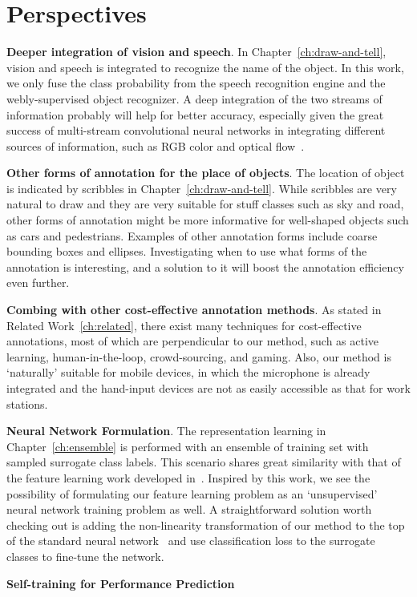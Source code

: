 \section{Perspectives} 

\textbf{Deeper integration of vision and speech}. In Chapter~\ref{ch:draw-and-tell}, vision and speech is integrated to recognize the name of the object. In this work, we only fuse the class probability from the speech recognition engine and the webly-supervised object recognizer. A deep integration of the two streams of information probably will help for better accuracy, especially given the great success of multi-stream convolutional neural networks in integrating different sources of information, such as RGB color and optical flow~\citep{two:stream:cnn}.  


\textbf{Other forms of annotation for the place of objects}. The location of object is indicated by scribbles in Chapter~\ref{ch:draw-and-tell}. While scribbles are very natural to draw and  they are very suitable for stuff classes such as sky and road, other forms of annotation might be more informative for well-shaped objects such as cars and pedestrians. Examples of other annotation forms include coarse bounding boxes and ellipses. Investigating when to use what forms of the annotation is interesting, and a solution to it will boost the annotation efficiency even further.  


\textbf{Combing with other cost-effective annotation methods}. As stated in Related Work~\ref{ch:related}, there exist many techniques for cost-effective annotations, most of which are perpendicular to our method, such as active learning, human-in-the-loop, crowd-sourcing, and gaming.  Also, our method is `naturally'  suitable for mobile devices, in which the microphone is already integrated and the hand-input devices are not as easily accessible as that for work stations. 
 

\textbf{Neural Network Formulation}. The  representation learning in Chapter~\ref{ch:ensemble} is performed with an ensemble of training set with sampled surrogate class labels. This scenario shares great similarity with that of the feature learning work developed in~\citep{cnnfet14}. Inspired by this work, we see the possibility of formulating our feature learning  problem as an `unsupervised' neural network training problem as well. A straightforward solution worth checking out is adding the non-linearity transformation of our method to the top of the standard neural network~\citep{deep:bmvc14} and use classification loss to the surrogate classes to fine-tune the network. 

\textbf{Self-training for Performance Prediction} 


